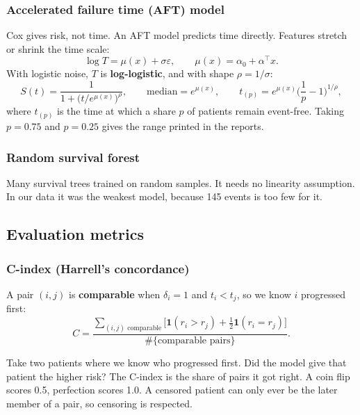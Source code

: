 \documentclass[11pt,a4paper]{article}
\newcommand{\term}[1]{\textbf{#1}}
\begin{document}
\subsubsection{Accelerated failure time (AFT) model}
Cox gives risk, not time. An AFT model predicts time directly. Features stretch or shrink the time scale:
\begin{equation}
\log T=\mu(x)+\sigma\varepsilon,\qquad \mu(x)=\alpha_0+\alpha^\top x.
\end{equation}
With logistic noise, $T$ is \term{log-logistic}, and with shape $\rho=1/\sigma$:
\begin{equation}
S(t)=\frac{1}{1+\big(t/e^{\mu(x)}\big)^{\rho}},\qquad \text{median}=e^{\mu(x)},\qquad t_{(p)}=e^{\mu(x)}\Big(\frac1p-1\Big)^{1/\rho},
\end{equation}
where $t_{(p)}$ is the time at which a share $p$ of patients remain event-free. Taking $p=0.75$ and $p=0.25$ gives the range printed in the reports.

\subsubsection{Random survival forest}
Many survival trees trained on random samples. It needs no linearity assumption. In our data it was the weakest model, because 145 events is too few for it.

\subsection{Evaluation metrics}

\subsubsection{C-index (Harrell's concordance)}
A pair $(i,j)$ is \term{comparable} when $\delta_i=1$ and $t_i<t_j$, so we know $i$ progressed first:
\begin{equation}
C=\frac{\sum_{(i,j)\text{ comparable}}\big[\mathbf{1}(r_i>r_j)+\tfrac12\mathbf{1}(r_i=r_j)\big]}{\#\{\text{comparable pairs}\}}.
\end{equation}
\begin{plainbox}
Take two patients where we know who progressed first. Did the model give that patient the higher risk? The C-index is the share of pairs it got right. A coin flip scores 0.5, perfection scores 1.0. A censored patient can only ever be the later member of a pair, so censoring is respected.
\end{plainbox}
\end{document}

